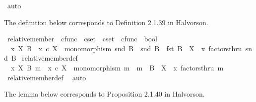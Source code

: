 \begin{isabellebody}
\ auto%
\endisatagproof
{\isafoldproof}%
%
\isadelimproof
%
\endisadelimproof
%
\begin{isamarkuptext}%
The definition below corresponds to Definition 2.1.39 in Halvorson.%
\end{isamarkuptext}\isamarkuptrue%
\isamarkupfalse%
\ relative{\isacharunderscore}{\kern0pt}member\ {\isacharcolon}{\kern0pt}{\isacharcolon}{\kern0pt}\ {\isachardoublequoteopen}cfunc\ {\isasymRightarrow}\ cset\ {\isasymRightarrow}\ cset\ {\isasymtimes}\ cfunc\ {\isasymRightarrow}\ bool{\isachardoublequoteclose}\ {\isacharparenleft}{\kern0pt}{\isachardoublequoteopen}{\isacharunderscore}{\kern0pt}\ {\isasymin}\isactrlbsub {\isacharunderscore}{\kern0pt}\isactrlesub \ {\isacharunderscore}{\kern0pt}{\isachardoublequoteclose}\ {\isacharbrackleft}{\kern0pt}{}{}{\isacharcomma}{\kern0pt}{}{}{\isacharcomma}{\kern0pt}{}{}{\isacharbrackright}{\kern0pt}{}{}{\isacharparenright}{\kern0pt}\ \isanewline
\ \ {\isachardoublequoteopen}x\ {\isasymin}\isactrlbsub X\isactrlesub \ B\ {\isasymlongleftrightarrow}\ {\isacharparenleft}{\kern0pt}x\ {\isasymin}\isactrlsub c\ X\ {\isasymand}\ monomorphism\ {\isacharparenleft}{\kern0pt}snd\ B{\isacharparenright}{\kern0pt}\ {\isasymand}\ snd\ B\ {\isacharcolon}{\kern0pt}\ fst\ B\ {\isasymrightarrow}\ X\ {\isasymand}\ x\ factorsthru\ {\isacharparenleft}{\kern0pt}snd\ B{\isacharparenright}{\kern0pt}{\isacharparenright}{\kern0pt}{\isachardoublequoteclose}\isanewline
\isanewline
{}\isamarkupfalse%
\ relative{\isacharunderscore}{\kern0pt}member{\isacharunderscore}{\kern0pt}def{}{\isacharcolon}{\kern0pt}\isanewline
\ \ {\isachardoublequoteopen}x\ {\isasymin}\isactrlbsub X\isactrlesub \ {\isacharparenleft}{\kern0pt}B{\isacharcomma}{\kern0pt}\ m{\isacharparenright}{\kern0pt}\ {\isacharequal}{\kern0pt}\ {\isacharparenleft}{\kern0pt}x\ {\isasymin}\isactrlsub c\ X\ {\isasymand}\ monomorphism\ m\ {\isasymand}\ m\ {\isacharcolon}{\kern0pt}\ B\ {\isasymrightarrow}\ X\ {\isasymand}\ x\ factorsthru\ m{\isacharparenright}{\kern0pt}{\isachardoublequoteclose}\isanewline
%
\isadelimproof
\ \ %
\endisadelimproof
%
\isatagproof
{}\isamarkupfalse%
\ relative{\isacharunderscore}{\kern0pt}member{\isacharunderscore}{\kern0pt}def\ \isamarkupfalse%
\ auto%
\endisatagproof
{\isafoldproof}%
%
\isadelimproof
%
\endisadelimproof
%
\begin{isamarkuptext}%
The lemma below corresponds to Proposition 2.1.40 in Halvorson.%

\end{isamarkuptext}
\end{isabellebody}
